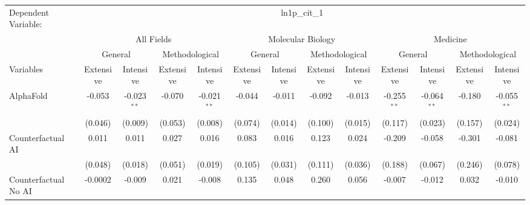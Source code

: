 \begingroup
\centering
\begin{tabular}{lcccccccccccc}
   \tabularnewline \midrule \midrule
   Dependent Variable: & \multicolumn{12}{c}{ln1p\_cit\_1}\\
 & \multicolumn{4}{c}{All Fields} & \multicolumn{4}{c}{Molecular Biology} & \multicolumn{4}{c}{Medicine} \\
\cmidrule(lr){2-5} \cmidrule(lr){6-9} \cmidrule(lr){10-13}
 & \multicolumn{2}{c}{General} & \multicolumn{2}{c}{Methodological} & \multicolumn{2}{c}{General} & \multicolumn{2}{c}{Methodological} & \multicolumn{2}{c}{General} & \multicolumn{2}{c}{Methodological} \\
\cmidrule(lr){2-3} \cmidrule(lr){4-5} \cmidrule(lr){6-7} \cmidrule(lr){8-9} \cmidrule(lr){10-11} \cmidrule(lr){12-13}
Variables & \multicolumn{1}{c}{Extensive} & \multicolumn{1}{c}{Intensive} & \multicolumn{1}{c}{Extensive} & \multicolumn{1}{c}{Intensive} & \multicolumn{1}{c}{Extensive} & \multicolumn{1}{c}{Intensive} & \multicolumn{1}{c}{Extensive} & \multicolumn{1}{c}{Intensive} & \multicolumn{1}{c}{Extensive} & \multicolumn{1}{c}{Intensive} & \multicolumn{1}{c}{Extensive} & \multicolumn{1}{c}{Intensive} \\
\cmidrule(lr){1-1}\cmidrule(lr){2-2} \cmidrule(lr){3-3} \cmidrule(lr){4-4} \cmidrule(lr){5-5} \cmidrule(lr){6-6} \cmidrule(lr){7-7} \cmidrule(lr){8-8} \cmidrule(lr){9-9} \cmidrule(lr){10-10} \cmidrule(lr){11-11} \cmidrule(lr){12-12} \cmidrule(lr){13-13}
   AlphaFold                                & -0.053  & -0.023$^{**}$ & -0.070  & -0.021$^{**}$ & -0.044  & -0.011  & -0.092  & -0.013  & -0.255$^{**}$ & -0.064$^{**}$ & -0.180  & -0.055$^{**}$\\   
                                            & (0.046) & (0.009)       & (0.053) & (0.008)       & (0.074) & (0.014) & (0.100) & (0.015) & (0.117)       & (0.023)       & (0.157) & (0.024)\\   
   Counterfactual AI                        & 0.011   & 0.011         & 0.027   & 0.016         & 0.083   & 0.016   & 0.123   & 0.024   & -0.209        & -0.058        & -0.301  & -0.081\\   
                                            & (0.048) & (0.018)       & (0.051) & (0.019)       & (0.105) & (0.031) & (0.111) & (0.036) & (0.188)       & (0.067)       & (0.246) & (0.078)\\   
   Counterfactual No AI                     & -0.0002 & -0.009        & 0.021   & -0.008        & 0.135   & 0.048   & 0.260   & 0.056   & -0.007        & -0.012        & 0.032   & -0.010\\   

\end{tabular}
